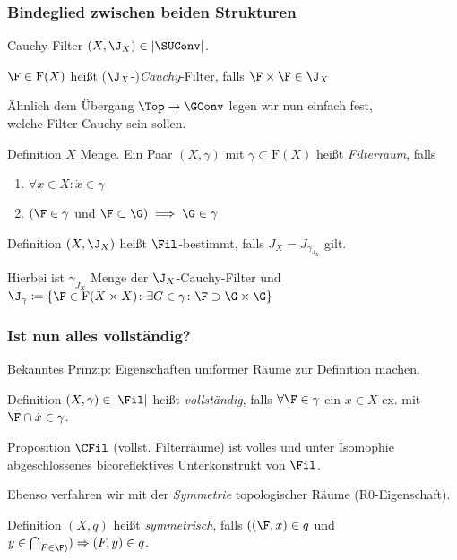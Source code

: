 \begin{frame}
  \frametitle{Bindeglied zwischen beiden Strukturen}
  \begin{block}{Cauchy-Filter}
    $(X,\J_X) \in |\SUConv|$.

    $\F \in \mathrm{F}(X)$ heißt ($\J_X$-)\emph{Cauchy}-Filter, falls $\F \times \F \in \J_X$
  \end{block}

  Ähnlich dem Übergang $\Top \to \GConv$ legen wir nun einfach fest,\\ welche Filter Cauchy sein sollen.

  \begin{block}{Definition}
    $X$ Menge. Ein Paar $(X, \gamma)$ mit $\gamma \subset \mathrm{F}(X)$ heißt \emph{Filterraum}, falls
    \begin{enumerate}[F1)]
      \item $\forall x \in X \colon \dot x \in \gamma$
      \item $(\F \in \gamma$ und $\F \subset \G) \implies \G \in \gamma$
    \end{enumerate}
  \end{block}

  \begin{block}{Definition}
    $(X, \J_X)$ heißt $\Fil$-bestimmt, falls $J_X = J_{\gamma_{J_X}}$ gilt. 
    
    Hierbei ist
    $\gamma_{J_X}$ Menge der $\J_X$-Cauchy-Filter und $\J_\gamma \coloneqq \{ \F \in \mathrm{F}(X \times X) \colon \exists G \in \gamma \colon \F \supset \G \times \G\}$
  \end{block}
\end{frame}

\begin{frame}
  \frametitle{Ist nun alles vollständig?}

  Bekanntes Prinzip: Eigenschaften uniformer Räume zur Definition machen.

  \begin{block}{Definition}
    $(X, \gamma) \in |\Fil|$ heißt \emph{vollständig}, falls $\forall \F \in \gamma$ ein $x \in X$ ex. mit $\F \cap \dot x \in \gamma$.
  \end{block}

  \begin{block}{Proposition}
    $\CFil$ (vollst. Filterräume) ist volles und unter Isomophie abgeschlossenes bicoreflektives Unterkonstrukt von $\Fil$.
  \end{block}

  Ebenso verfahren wir mit der \emph{Symmetrie} topologischer Räume (R0-Eigenschaft).

  \begin{block}{Definition}
    $(X,q)$ heißt \emph{symmetrisch}, falls $((\F,x) \in q$  und $y \in \bigcap _{F \in \F)}) \Rightarrow (F,y) \in q$.
  \end{block}
\end{frame}

